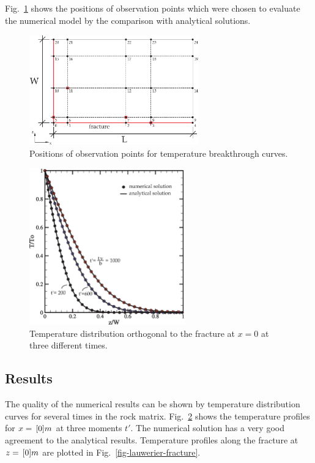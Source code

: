 Fig.~\ref{fig-lauwerier-scheme} shows the positions of observation points which were chosen to evaluate the numerical model by the comparison with analytical solutions. 
%
\begin{figure}[!htbp]
\centering
\includegraphics[width=0.65\textwidth]{PART_II/T/lauwerier-scheme.eps}
\caption{\label{fig-lauwerier-scheme}Positions of observation points for temperature breakthrough curves.}
\end{figure}

\begin{figure}[H]
\centering
\includegraphics[width=0.6\textwidth]{PART_II/T/lauwerier-rock.eps}
\caption{Temperature distribution orthogonal to the fracture at $x=0$ at three different times.}
\label{fig-lauwerier-rock}
\end{figure}

\subsection{Results}

The quality of the numerical results can be shown by temperature distribution curves for several times in the rock matrix. Fig.~\ref{fig-lauwerier-rock} shows the temperature profiles for $x=\, \mathrm{[}0]{m}$ at three moments $t'$. The numerical solution has a very good agreement to the analytical results. Temperature profiles along the fracture at $z=\, \mathrm{[}0]{m}$ are plotted in Fig.~\ref{fig-lauwerier-fracture}. 

